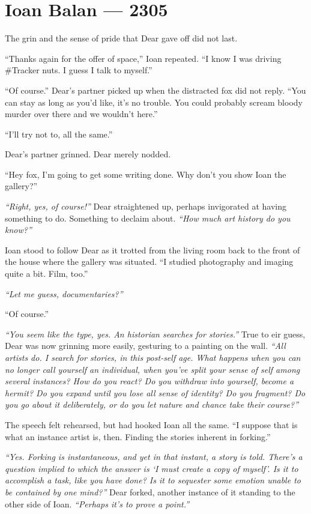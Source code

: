 \hypertarget{ioan-balan-2305}{%
\chapter*{Ioan Balan — 2305}\label{ioan-balan-2305}}

The grin and the sense of pride that Dear gave off did not last.

``Thanks again for the offer of space,'' Ioan repeated. ``I know I was driving \#Tracker nuts. I guess I talk to myself.''

``Of course.'' Dear's partner picked up when the distracted fox did not reply. ``You can stay as long as you'd like, it's no trouble. You could probably scream bloody murder over there and we wouldn't here.''

``I'll try not to, all the same.''

Dear's partner grinned. Dear merely nodded.

``Hey fox, I'm going to get some writing done. Why don't you show Ioan the gallery?''

\emph{``Right, yes, of course!''} Dear straightened up, perhaps invigorated at having something to do. Something to declaim about. \emph{``How much art history do you know?''}

Ioan stood to follow Dear as it trotted from the living room back to the front of the house where the gallery was situated. ``I studied photography and imaging quite a bit. Film, too.''

\emph{``Let me guess, documentaries?''}

``Of course.''

\emph{``You seem like the type, yes. An historian searches for stories.''} True to eir guess, Dear was now grinning more easily, gesturing to a painting on the wall. \emph{``All artists do. I search for stories, in this post-self age. What happens when you can no longer call yourself an individual, when you've split your sense of self among several instances? How do you react? Do you withdraw into yourself, become a hermit? Do you expand until you lose all sense of identity? Do you fragment? Do you go about it deliberately, or do you let nature and chance take their course?''}

The speech felt rehearsed, but had hooked Ioan all the same. ``I suppose that is what an instance artist is, then. Finding the stories inherent in forking.''

\emph{``Yes. Forking is instantaneous, and yet in that instant, a story is told. There's a question implied to which the answer is `I must create a copy of myself'. Is it to accomplish a task, like you have done? Is it to sequester some emotion unable to be contained by one mind?''} Dear forked, another instance of it standing to the other side of Ioan. \emph{``Perhaps it's to prove a point.''}

